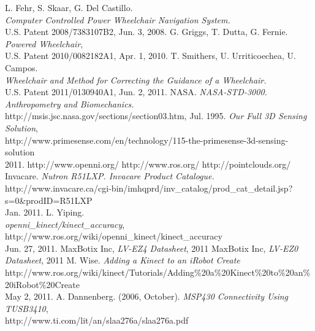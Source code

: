 \documentclass[oneside,final,a4paper]{report}
\begin{document}
\begin{thebibliography}{9}


  L. Fehr, S. Skaar, G. Del Castillo. \\
  \emph{Computer Controlled Power Wheelchair Navigation System.} \\
  U.S. Patent 2008/7383107B2, Jun. 3, 2008.
  G. Griggs, T. Dutta, G. Fernie. \emph{Powered Wheelchair},\\
  U.S. Patent 2010/0082182A1, Apr. 1, 2010.
  T. Smithers, U. Urriticoechea, U. Campos. \\
  \emph{Wheelchair and Method for Correcting the Guidance of a Wheelchair.} \\
  U.S. Patent 2011/0130940A1, Jun. 2, 2011.
  NASA. \emph{NASA-STD-3000. Anthropometry and Biomechanics.}\\
  http://msis.jsc.nasa.gov/sections/section03.htm, Jul. 1995.
  \emph{Our Full 3D Sensing Solution}, \\
  \mbox{http://www.primesense.com/en/technology/115-the-primesense-3d-sensing-solution} \\
  2011.
  http://www.openni.org/
  http://www.ros.org/
  http://pointclouds.org/
  Invacare. \emph{Nutron R51LXP. Invacare Product Catalogue.} \\
  http://www.invacare.ca/cgi-bin/imhqprd/inv\_catalog/prod\_cat\_detail.jsp?s=0\&prodID=R51LXP\\
 Jan. 2011.
  L. Yiping. \\
  \emph{openni\_kinect/kinect\_accuracy}, http://www.ros.org/wiki/openni\_kinect/kinect\_accuracy\\
  Jun. 27, 2011.
  MaxBotix Inc, \emph{LV-EZ4 Datasheet},  2011
  MaxBotix Inc, \emph{LV-EZ0 Datasheet},  2011
  M. Wise.  \emph{Adding a Kinect to an iRobot Create} \\
  http://www.ros.org/wiki/kinect/Tutorials/Adding\%20a\%20Kinect\%20to\%20an\%20iRobot\%20Create\\
  May 2, 2011.
  A. Dannenberg. (2006, October). \emph{MSP430 Connectivity Using TUSB3410},\\
  http://www.ti.com/lit/an/slaa276a/slaa276a.pdf

\end{thebibliography}
\end{document}
